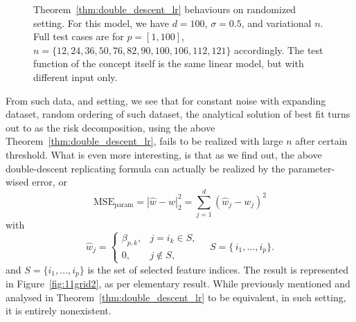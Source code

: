 \documentclass{article}
\begin{document}
\begin{figure}[htb]
  \caption{Theorem~\ref{thm:double_descent_lr} behaviours on randomized setting. For this model, we have $d=100$, $\sigma = 0.5$, and variational $n$. Full test cases are for $p=[1,100]$, $n=\{12,24,36,50,76,82,90,100,106,112,121\}$ accordingly. The test function of the concept itself is the same linear model, but with different input only.}
  \label{fig:11grid}
\end{figure}

From such data, and setting, we see that for constant noise with expanding dataset, random ordering of such dataset, the analytical solution of best fit turns out to as the risk decomposition, using the above Theorem~\ref{thm:double_descent_lr}, fails to be realized with large $n$ after certain threshold. What is even more interesting, is that as we find out, the above double-descent replicating formula can actually be realized by the parameter-wised error, or 
\begin{equation}
\mathrm{MSE}_{\mathrm{param}}=\left\lvert \hat w - w \right\rvert _{2}^{2}=
\sum_{j=1}^{d}
\left(
  \hat w_{j} - w_{j}
\right)^{2}
\end{equation}
with 
\begin{equation}
\hat w_{j}
=
\begin{cases}
\beta_{p,k}, & j = i_{k} \in S,\\[6pt]
0,           & j \notin S,
\end{cases}
\quad
S = \{\,i_{1},\dots,i_{p}\}.
\end{equation}
and \(S=\{i_1,\dots,i_p\}\) is the set of selected feature indices. The result is represented in Figure~\ref{fig:11grid2}, as per elementary result. While previously mentioned and analysed in Theorem~\ref{thm:double_descent_lr} to be equivalent, in such setting, it is entirely nonexistent. 
\end{document}
